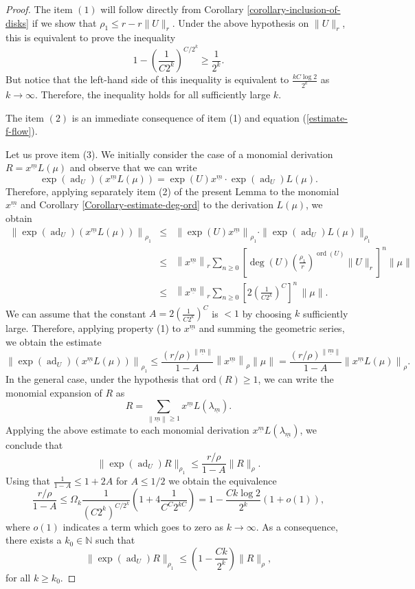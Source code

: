 \documentclass[10pt,twoside,reqno]{amsart}
\theoremstyle{remark}
\theoremstyle{remark}
\newcommand{\N}{\mathbb{N}}
\newcommand{\um}{{\underline m}}
\newcommand{\ad}{\operatorname{ad}}
\newcommand{\tmop}[1]{{\operatorname{#1}}}
\newcommand{\ord}{\mathrm{ord}}
\begin{document}
\begin{proof}
  The item $(1)$ will follow directly from Corollary
  \ref{corollary-inclusion-of-disks} if we show that $\rho_1 \leq r - r
  \| U \|_r$. Under the above hypothesis on $\|U\|_r$, this is equivalent to prove the inequality
  \[ 1 - \left( \frac{1}{C 2^k} \right)^{C / 2^k} \geq \frac{1}{2^k}. \]
  But notice that the left-hand side of this inequality is equivalent to
  $\frac{k C\log 2}{2^k}$ as $k \rightarrow \infty$. Therefore, the
  inequality holds for all sufficiently large $k$.
  
  The item $(2)$ is an immediate consequence of item (1) and equation
  (\ref{estimate-f-flow}).
  
  Let us prove item (3). We initially consider the case of a monomial
  derivation $R = x^{\um} L (\mu)$ and observe that we can write
  \[ \exp (\ad_U) \left( x^{\um} L (\mu) \right) = \exp (U) x^{\um}
     \cdot \exp (\ad_U) L (\mu). \]
  Therefore, applying separately item (2) of the present Lemma to the monomial $x^{\um}$ and Corollary
  \ref{Corollary-estimate-deg-ord} to the derivation $L (\mu)$, we obtain
  \begin{eqnarray*}
    \left\| \exp (\ad_U) \left( x^{\um} L (\mu) \right)
    \right\|_{\rho_1} & \leq & \left\| \exp (U) x^{\um} \right\|_{\rho_1}
    \cdot \| \exp (\ad_U) L (\mu) \|_{\rho_1}\\
    & \leq & \left\| x^{\um} \right\|_r  \sum_{n \geq 0} \left[
    \deg (U)  \left( \frac{\rho_1}{r} \right)^{\tmop{ord} (U)}  \| U \|_r
    \right]^n \| \mu \|\\
    & \leq & \left\| x^{\um} \right\|_r \sum_{n \geq 0} \left[ 2
    \left( \frac{1}{C 2^k} \right)^C  \right]^n\, \| \mu \|.
  \end{eqnarray*}
  We can assume that the constant $A = 2 \left( \frac{1}{C 2^k} \right)^C$ is
  $< 1$ by choosing $k$ sufficiently large. Therefore, applying property (1)
  to $x^{\um}$ and summing the geometric series, we obtain the estimate
  \[ \left\| \exp (\ad_U) \left( x^{\um} L (\mu) \right)
     \right\|_{\rho_1} \leq \frac{\left( r/\rho \right)^{\left\|
     \um \right\|}}{1 - A}  \left\| x^{\um} \right\|_{\rho} \| \mu \| =
     \frac{\left( r/\rho \right)^{\left\| \um \right\|}}{1 - A} 
     \left\| x^{\um} L (\mu) \right\|_{\rho} . \]
  In the general case, under the hypothesis that $\ord(R) \geq 1$, we
  can write the monomial expansion of $R$ as
  \[ R = \sum_{\left\| \um \right\| \geq 1} x^{\um} L \left( \lambda_{\um}
     \right). \]
  Applying the above estimate to each monomial derivation $x^{\um} L \left(
  \lambda_{\um} \right)$, we conclude that
  \[ \| \exp (\ad_U) R \|_{\rho_1} \leq \frac{r / \rho}{1 - A}  \|
     R \|_{\rho}. \]
Using that $\frac{1}{1 - A} \leqslant 1 + 2 A$ for $A \leqslant 1 / 2$ we obtain the equivalence
\[ \frac{r / \rho}{1 - A} \leqslant \Omega_k \frac{1}{(C 2^k)^{C / 2^k}}
   \left( 1 + 4 \frac{1}{C^C 2^{k C}} \right) = 1 - \frac{C k \log 2}{2^k}(1+o(1)),
\]
where $o(1)$ indicates a term which goes to zero as $k \rightarrow \infty$. As a consequence, there exists a $k_0 \in \N$ such that
\[ \| \exp (\tmop{ad}_U) R \|_{\rho_1} \leqslant \left( 1 - \frac{C k}{2^k}
   \right)  \| R \|_{\rho}, \]
for all $k \ge k_0$.      
\end{proof}
\end{document}
